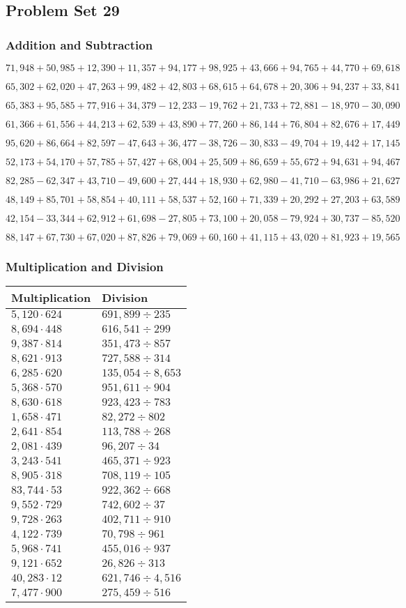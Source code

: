 \hypertarget{problem-set-29-4}{%
\subsection{Problem Set 29}\label{problem-set-29-4}}

\hypertarget{addition-and-subtraction-251}{%
\subsubsection{Addition and
Subtraction}\label{addition-and-subtraction-251}}

\(71,948+50,985+12,390+11,357+94,177+98,925+43,666+94,765+44,770+ 69,618\)

\(65,302+62,020+47,263+99,482+42,803+68,615+64,678+20,306+94,237+33,841\)

\(65,383+95,585+77,916+34,379-12,233-19,762+21,733+72,881-18,970-30,090\)

\(61,366+61,556+44,213+62,539+43,890+77,260+86,144+76,804+82,676+17,449\)

\(95,620+86,664+82,597-47,643+36,477-38,726-30,833-49,704+19,442+17,145\)

\(52,173+54,170+57,785+57,427+68,004+25,509+86,659+55,672+94,631+94,467\)

\(82,285-62,347+43,710-49,600+27,444+18,930+62,980-41,710-63,986+21,627\)

\(48,149+85,701+58,854+40,111+58,537+52,160+71,339+20,292+27,203+63,589\)

\(42,154-33,344+62,912+61,698-27,805+73,100+20,058-79,924+30,737-85,520\)

\(88,147+67,730+67,020+87,826+79,069+60,160+41,115+43,020+81,923+19,565\)

\hypertarget{multiplication-and-division-250}{%
\subsubsection{Multiplication and
Division}\label{multiplication-and-division-250}}

\begin{longtable}[]{@{}ll@{}}
\toprule
Multiplication & Division\tabularnewline
\midrule
\endhead
\(5,120\cdot624\) & \(691,899÷235\)\tabularnewline
\(8,694\cdot448\) & \(616,541÷299\)\tabularnewline
\(9,387\cdot814\) & \(351,473÷857\)\tabularnewline
\(8,621\cdot913\) & \(727,588÷314\)\tabularnewline
\(6,285\cdot620\) & \(135,054÷8,653\)\tabularnewline
\(5,368\cdot570\) & \(951,611÷904\)\tabularnewline
\(8,630\cdot618\) & \(923,423÷783\)\tabularnewline
\(1,658\cdot471\) & \(82,272÷802\)\tabularnewline
\(2,641\cdot854\) & \(113,788÷268\)\tabularnewline
\(2,081\cdot439\) & \(96,207÷34\)\tabularnewline
\(3,243\cdot541\) & \(465,371÷923\)\tabularnewline
\(8,905\cdot318\) & \(708,119÷105\)\tabularnewline
\(83,744\cdot53\) & \(922,362÷668\)\tabularnewline
\(9,552\cdot729\) & \(742,602÷37\)\tabularnewline
\(9,728\cdot263\) & \(402,711÷910\)\tabularnewline
\(4,122\cdot739\) & \(70,798÷961\)\tabularnewline
\(5,968\cdot741\) & \(455,016÷937\)\tabularnewline
\(9,121\cdot652\) & \(26,826÷313\)\tabularnewline
\(40,283\cdot12\) & \(621,746÷4,516\)\tabularnewline
\(7,477\cdot900\) & \(275,459÷516\)\tabularnewline
\bottomrule
\end{longtable}

